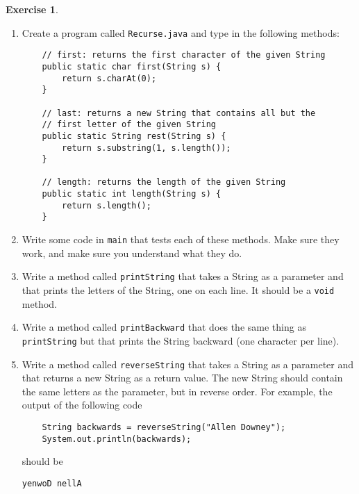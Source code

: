 \documentclass[12pt]{book}
\theoremstyle{definition}
\newtheorem{excz}{Exercise}[chapter]
\newenvironment{exercise}{\bigskip\begin{excz}\mbox{}}{\end{excz}}
\begin{document}
\begin{exercise}
\begin{enumerate}

\item Create a program called {\tt Recurse.java} and
type in the following methods:

\begin{lstlisting}
    // first: returns the first character of the given String
    public static char first(String s) {
        return s.charAt(0);
    }

    // last: returns a new String that contains all but the
    // first letter of the given String
    public static String rest(String s) {
        return s.substring(1, s.length());
    }

    // length: returns the length of the given String
    public static int length(String s) {
        return s.length();
    }
\end{lstlisting}

\item Write some code in {\tt main} that tests each of these
methods.  Make sure they work, and make sure you understand
what they do.

\item Write a method called {\tt printString} that takes a
String as a parameter and that prints the letters of the
String, one on each line.  It should be a {\tt void} method.

\item Write a method called {\tt printBackward} that does
the same thing as {\tt printString} but that prints the String
backward (one character per line).

\item Write a method called {\tt reverseString} that takes
a String as a parameter and that returns a new String as a
return value.  The new String should contain the same letters
as the parameter, but in reverse order.  For example, the
output of the following code

\begin{lstlisting}
	String backwards = reverseString("Allen Downey");
	System.out.println(backwards);
\end{lstlisting}
%
should be

\begin{lstlisting}
yenwoD nellA
\end{lstlisting}

\end{enumerate}
\end{exercise}
\end{document}
